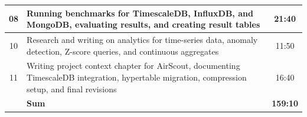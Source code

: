 \begin{table}[H]
\begin{tabularx}{\textwidth}{|c|X|c|}
        \hline %
        08            & Running benchmarks for TimescaleDB, InfluxDB, and MongoDB, evaluating results, and creating result tables                                       & 21:40           \\
        \hline %
        10            & Research and writing on analytics for time-series data, anomaly detection, Z-score queries, and continuous aggregates                           & 11:50           \\
        \hline %
        11            & Writing project context chapter for AirScout, documenting TimescaleDB integration, hypertable migration, compression setup, and final revisions & 16:40           \\
        \hline %
                      & \textbf{Sum}                                                                                                                                    & \textbf{159:10} \\
        \hline %
    \end{tabularx}
\end{table}
